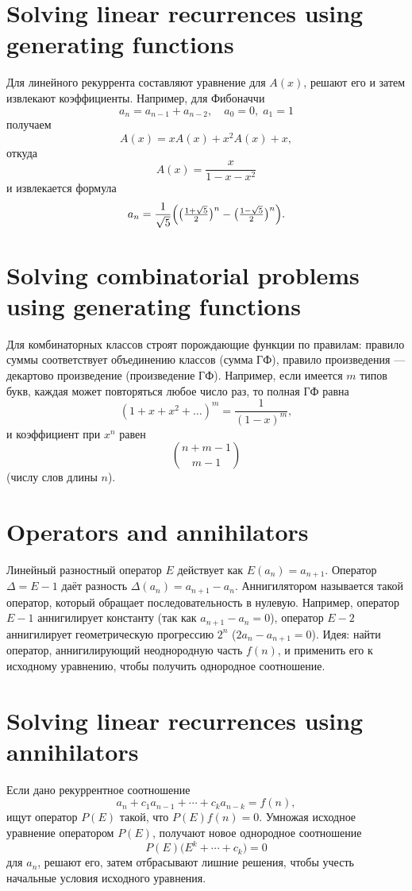 \documentclass{article}
\begin{document}
	\section{Solving linear recurrences using generating functions}
	Для линейного рекуррента составляют уравнение для $A(x)$, решают его и затем извлекают коэффициенты. Например, для Фибоначчи 
	\[
	a_n = a_{n-1} + a_{n-2},\quad a_0=0,\;a_1=1
	\]
	получаем 
	\[
	A(x) = xA(x) + x^2 A(x) + x,
	\]
	откуда 
	\[
	A(x)=\frac{x}{1-x-x^2}
	\]
	и извлекается формула 
	\[
	a_n = \frac{1}{\sqrt5}\Bigl(\bigl(\tfrac{1+\sqrt5}2\bigr)^n - \bigl(\tfrac{1-\sqrt5}2\bigr)^n\Bigr).
	\]
	
	\section{Solving combinatorial problems using generating functions}
	Для комбинаторных классов строят порождающие функции по правилам: правило суммы соответствует объединению классов (сумма ГФ), правило произведения --- декартово произведение (произведение ГФ). Например, если имеется $m$ типов букв, каждая может повторяться любое число раз, то полная ГФ равна 
	\[
	(1+x+x^2+\dots)^m = \frac{1}{(1-x)^m},
	\]
	и коэффициент при $x^n$ равен 
	\[
	\binom{n+m-1}{m-1}
	\]
	(числу слов длины $n$).
	
	\section{Operators and annihilators}
	Линейный разностный оператор $E$ действует как $E(a_n)=a_{n+1}$. Оператор $\Delta = E-1$ даёт разность $\Delta(a_n)=a_{n+1}-a_n$. Аннигилятором называется такой оператор, который обращает последовательность в нулевую. Например, оператор $E-1$ аннигилирует константу (так как $a_{n+1}-a_n=0$), оператор $E-2$ аннигилирует геометрическую прогрессию $2^n$ ($2a_{n} - a_{n+1}=0$). Идея: найти оператор, аннигилирующий неоднородную часть $f(n)$, и применить его к исходному уравнению, чтобы получить однородное соотношение.
	
	\section{Solving linear recurrences using annihilators}
	Если дано рекуррентное соотношение 
	\[
	a_n + c_1 a_{n-1} + \cdots + c_k a_{n-k} = f(n),
	\]
	ищут оператор $P(E)$ такой, что $P(E)f(n)=0$. Умножая исходное уравнение оператором $P(E)$, получают новое однородное соотношение 
	\[
	P(E)\bigl(E^k + \cdots + c_k\bigr)=0
	\]
	для $a_n$, решают его, затем отбрасывают лишние решения, чтобы учесть начальные условия исходного уравнения.
	
\end{document}
